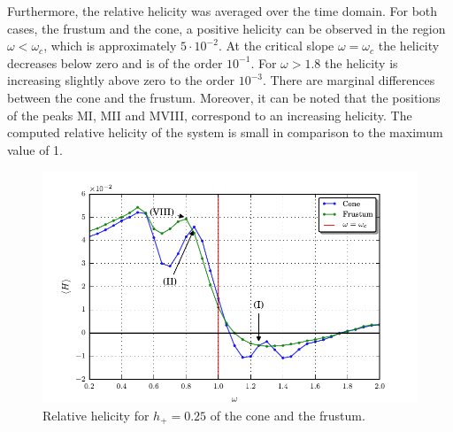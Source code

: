 Furthermore, the relative helicity was averaged over the time domain.
For both cases, the frustum and the cone, a positive helicity can be observed in the region $\omega<\omega_c$, which is
approximately $5\cdot 10^{-2}$.
At the critical slope $\omega=\omega_c$ the helicity decreases below zero and is of the order $10^{-1}$.
For $\omega>1.8$ the helicity is increasing slightly above zero to the order $10^{-3}$.
There are marginal differences between the cone and the frustum.
Moreover, it can be noted that the positions of the peaks M\RN{1}, M\RN{2} and M\RN{8},
correspond to an increasing helicity.
The computed relative helicity of the system is small in
comparison to the maximum value of 1.

\begin{figure}[!b]
  \centering
  \includegraphics{gfx/cone/final/helicity.pdf}
  \caption{
      \label{fig:cone:finalhelicity}
      Relative helicity for $h_+=0.25$ of the cone and the frustum.
    }
\end{figure}

\clearpage


